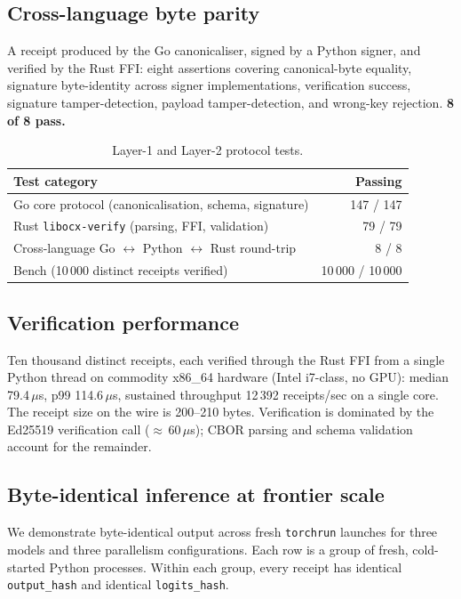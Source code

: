 \documentclass[10pt]{article}
\begin{document}
\subsection{Cross-language byte parity}

A receipt produced by the Go canonicaliser, signed by a Python signer, and verified by the Rust FFI: eight assertions covering canonical-byte equality, signature byte-identity across signer implementations, verification success, signature tamper-detection, payload tamper-detection, and wrong-key rejection. \textbf{8 of 8 pass.}

\begin{table}[h]
\centering
\small
\begin{tabular}{lr}
\toprule
Test category & Passing \\
\midrule
Go core protocol (canonicalisation, schema, signature) & 147 / 147 \\
Rust \texttt{libocx-verify} (parsing, FFI, validation) & 79 / 79 \\
Cross-language Go $\leftrightarrow$ Python $\leftrightarrow$ Rust round-trip & 8 / 8 \\
Bench (10\,000 distinct receipts verified) & 10\,000 / 10\,000 \\
\bottomrule
\end{tabular}
\caption{Layer-1 and Layer-2 protocol tests.}
\end{table}

\subsection{Verification performance}

Ten thousand distinct receipts, each verified through the Rust FFI from a single Python thread on commodity x86\_64 hardware (Intel i7-class, no GPU): median 79.4\,$\mu$s, p99 114.6\,$\mu$s, sustained throughput 12\,392 receipts/sec on a single core. The receipt size on the wire is 200--210 bytes. Verification is dominated by the Ed25519 verification call ($\approx$\,60\,$\mu$s); CBOR parsing and schema validation account for the remainder.

\subsection{Byte-identical inference at frontier scale}

We demonstrate byte-identical output across fresh \texttt{torchrun} launches for three models and three parallelism configurations. Each row is a group of fresh, cold-started Python processes. Within each group, every receipt has identical \texttt{output\_hash} and identical \texttt{logits\_hash}.
\end{document}
